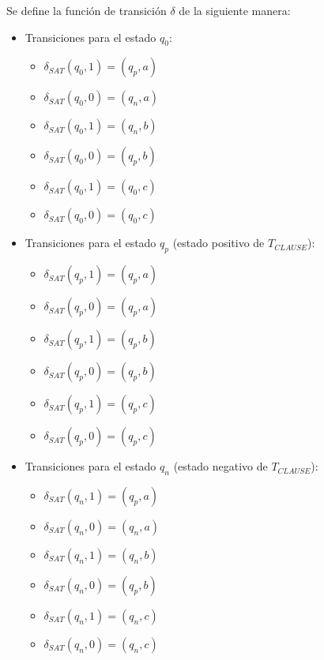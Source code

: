 Se define la función de transición $\delta$ de la siguiente manera:

\begin{itemize}
    \item Transiciones para el estado $q_0$:
          \begin{multicols}{2}
              \begin{itemize}
                  \item $\delta_{SAT}(q_0,1)=(q_p,a)$
                  \item $\delta_{SAT}(q_0,0)=(q_n,a)$
                  \item $\delta_{SAT}(q_0,1)=(q_n,b)$
                  \item $\delta_{SAT}(q_0,0)=(q_p,b)$
                  \item $\delta_{SAT}(q_0,1)=(q_0,c)$
                  \item $\delta_{SAT}(q_0,0)=(q_0,c)$
              \end{itemize}
          \end{multicols}

    \item Transiciones para el estado $q_p$ (estado positivo de $T_{CLAUSE}$):
          \begin{multicols}{2}
              \begin{itemize}
                  \item $\delta_{SAT}(q_{p},1)=(q_{p},a)$
                  \item $\delta_{SAT}(q_{p},0)=(q_{p},a)$
                  \item $\delta_{SAT}(q_{p},1)=(q_{p},b)$
                  \item $\delta_{SAT}(q_{p},0)=(q_{p},b)$
                  \item $\delta_{SAT}(q_{p},1)=(q_{p},c)$
                  \item $\delta_{SAT}(q_{p},0)=(q_{p},c)$
              \end{itemize}
          \end{multicols}

    \item Transiciones para el estado $q_n$ (estado negativo de $T_{CLAUSE}$):
          \begin{multicols}{2}
              \begin{itemize}
                  \item $\delta_{SAT}(q_{n},1)=(q_{p},a)$
                  \item $\delta_{SAT}(q_{n},0)=(q_{n},a)$
                  \item $\delta_{SAT}(q_{n},1)=(q_{n},b)$
                  \item $\delta_{SAT}(q_{n},0)=(q_{p},b)$
                  \item $\delta_{SAT}(q_{n},1)=(q_{n},c)$
                  \item $\delta_{SAT}(q_{n},0)=(q_{n},c)$
              \end{itemize}
          \end{multicols}
\end{itemize}

